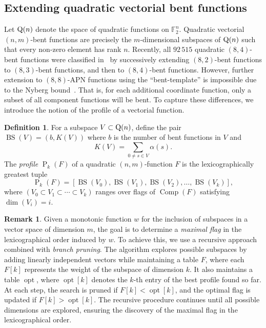 \documentclass{amsart}[11pt]
\theoremstyle{plain}
\theoremstyle{definition}
\newtheorem{definition}[theorem]{Definition}
\newtheorem{remark}[theorem]{Remark}
\numberwithin{theorem}{section}
\numberwithin{equation}{section}
\numberwithin{table}{section}
\numberwithin{figure}{section}
\numberwithin{algorithm}{section}
\def\qfspace(#1){{{\rm Q}(#1)}}
\begin{document}
\subsection{Extending quadratic vectorial bent functions}\label{sec: bent to apn}
Let $\qfspace(n)$ denote the space of quadratic functions on $\mathbb{F}_2^n$. Quadratic vectorial $(n,m)$-bent functions are precisely the $m$-dimensional subspaces of $\qfspace(n)$ such that every non-zero element has rank $n$. Recently, all $92\,515$ quadratic $(8,4)$-bent functions were classified in~\cite{PolujanPott2022BFA} by successively extending $(8,2)$-bent functions to $(8,3)$-bent functions, and then to $(8,4)$-bent functions. However, further extension to $(8,8)$-APN functions using the ``bent-template'' is impossible due to the Nyberg bound~\cite{Nyberg91}. That is, for each additional coordinate function, only a subset of all component functions will be bent. To capture these differences, we introduce the notion of the profile of a vectorial function.

\begin{definition}
    For a subspace $V\subset\qfspace(n)$, define the pair $\operatorname{BS}(V) = (b, K(V))$ where $b$ is the number of bent functions in $V$ and $$K(V) = \sum_{0 \neq s \in V} \alpha(s).$$ The \emph{profile} $\operatorname{P}_k(F)$ of a quadratic $(n,m)$-function $F$ is the lexicographically greatest tuple
    \begin{equation}\label{eq: profile}
        \operatorname{P}_k(F)=[\operatorname{BS}(V_0), \operatorname{BS}(V_1), \operatorname{BS}(V_2), \ldots, \operatorname{BS}(V_k)],
    \end{equation}
	where $(V_0 \subset V_1 \subset \cdots \subset V_k)$ ranges over flags of $\operatorname{Comp}(F)$ satisfying $\dim(V_i)=i$.
\end{definition}

\begin{remark}
    Given a monotonic function $w$ for the inclusion of subspaces in a vector space of dimension $m$, the goal is to determine a \textit{maximal flag} in the lexicographical order induced by $w$. To achieve this, we use a recursive approach combined with  \textit{branch pruning}. The algorithm explores possible subspaces by adding linearly independent vectors while maintaining a table $F$, where each $F[k]$ represents the weight of the subspace of dimension $k$. It also maintains a table $\operatorname{opt}$, where $\operatorname{opt}[k]$ denotes the $k$-th entry of the best profile found so far. At each step, the search is pruned if $F[k] < \operatorname{opt}[k]$, and the optimal flag is updated if $F[k] > \operatorname{opt}[k]$. The recursive procedure continues until all possible dimensions are explored, ensuring the discovery of the maximal flag in the lexicographical order.
\end{remark}
\end{document}
